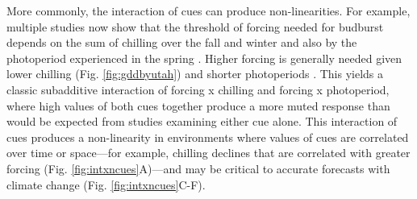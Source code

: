 \documentclass[11pt,letter]{article}
\begin{document}
More commonly, the interaction of cues can produce non-linearities. For example, multiple studies now show that the threshold of forcing needed for budburst depends on the sum of chilling over the fall and winter and also by the photoperiod experienced in the spring \citep[e.g.,][]{zohner2014,flynn2018}. Higher forcing is generally needed given lower chilling (Fig. \ref{fig:gddbyutah}) and shorter photoperiods \citep{Basler:2014aa,fu2019}. This yields a classic subadditive interaction of forcing x chilling and forcing x photoperiod, where high values of both cues together produce a more muted response than would be expected from studies examining either cue alone. This interaction of cues produces a non-linearity in environments where values of cues are correlated over time or space---for example, chilling declines that are correlated with greater forcing (Fig. \ref{fig:intxncues}A)---and may be critical to accurate forecasts with climate change (Fig. \ref{fig:intxncues}C-F). \\ %

\end{document}
